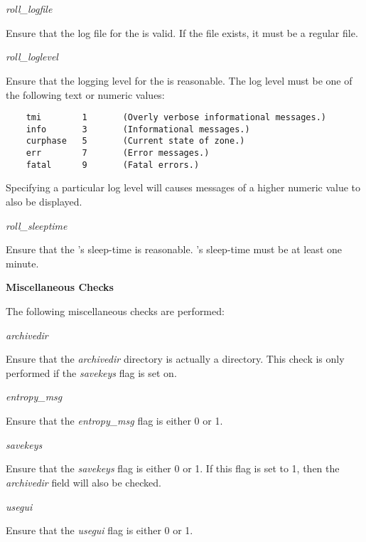 \begin{description}

\item {\it roll\_logfile}\verb" "

Ensure that the log file for the  is valid.  If the file
exists, it must be a regular file.

\item {\it roll\_loglevel}\verb" "

Ensure that the logging level for the  is reasonable.  The
log level must be one of the following text or numeric values:

\begin{verbatim}
    tmi        1       (Overly verbose informational messages.)
    info       3       (Informational messages.)
    curphase   5       (Current state of zone.)
    err        7       (Error messages.)
    fatal      9       (Fatal errors.)
\end{verbatim}

Specifying a particular log level will causes messages of a higher numeric
value to also be displayed.

\item {\it roll\_sleeptime}\verb" "

Ensure that the 's sleep-time is reasonable.
's sleep-time must be at least one minute.

\end{description}

{\bf Miscellaneous Checks}

The following miscellaneous checks are performed:

\begin{description}

\item {\it archivedir}\verb" "

Ensure that the {\it archivedir} directory is actually a directory.
This check is only performed if the {\it savekeys} flag is set on.

\item {\it entropy\_msg}\verb" "

Ensure that the {\it entropy\_msg} flag is either 0 or 1.

\item {\it savekeys}\verb" "

Ensure that the {\it savekeys} flag is either 0 or 1.
If this flag is set to 1, then the {\it archivedir} field will also be checked.

\item {\it usegui}\verb" "

Ensure that the {\it usegui} flag is either 0 or 1.

\end{description}

